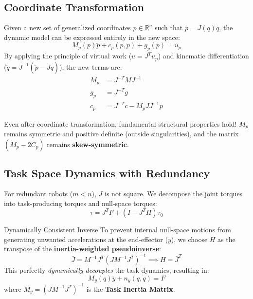 \documentclass[11pt,a4paper]{article}
\begin{document}
\subsection{Coordinate Transformation}
Given a new set of generalized coordinates $p \in \mathbb{R}^n$ such that $\dot{p} = J(q)\dot{q}$, the dynamic model can be expressed entirely in the new space:
\begin{equation}
    M_p(p)\ddot{p} + c_p(p, \dot{p}) + g_p(p) = u_p
\end{equation}
By applying the principle of virtual work ($u = J^T u_p$) and kinematic differentiation ($\ddot{q} = J^{-1}(\ddot{p} - \dot{J}\dot{q})$), the new terms are:
\begin{align}
    M_p &= J^{-T} M J^{-1} \\
    g_p &= J^{-T} g \\
    c_p &= J^{-T} c - M_p \dot{J} J^{-1} \dot{p}
\end{align}

\begin{examtip}
    Even after coordinate transformation, fundamental structural properties hold! $M_p$ remains symmetric and positive definite (outside singularities), and the matrix $(\dot{M}_p - 2C_p)$ remains \textbf{skew-symmetric}.
\end{examtip}

\subsection{Task Space Dynamics with Redundancy}
For redundant robots ($m < n$), $J$ is not square. We decompose the joint torques into task-producing torques and null-space torques:
\begin{equation}
    \tau = J^T F + (I - J^T H) \tau_0
\end{equation}

\begin{theorybox}{Dynamically Consistent Inverse}
To prevent internal null-space motions from generating unwanted accelerations at the end-effector ($\ddot{y}$), we choose $H$ as the transpose of the \textbf{inertia-weighted pseudoinverse}:
\begin{equation}
    \bar{J} = M^{-1} J^T (J M^{-1} J^T)^{-1} \implies H = \bar{J}^T
\end{equation}
This perfectly \textit{dynamically decouples} the task dynamics, resulting in:
\begin{equation}
    M_y(q)\ddot{y} + n_y(q, \dot{q}) = F
\end{equation}
where $M_y = (J M^{-1} J^T)^{-1}$ is the \textbf{Task Inertia Matrix}.
\end{theorybox}
\end{document}
